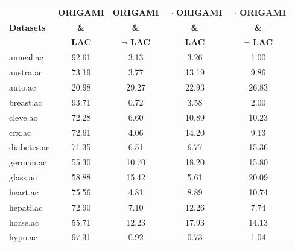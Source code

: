 \begin{table}[htbp]
	\centering
		\renewcommand{\tabcolsep}{1.8mm}
		\begin{tabular}{|l|c|c|c|c|}
		\hline
				& \textbf{ORIGAMI}	& \textbf{ORIGAMI}		& \textbf{$\neg$ ORIGAMI}	& \textbf{$\neg$ ORIGAMI}	\\
		\textbf{Datasets}	& \textbf{\&}		& \textbf{\&}			& \textbf{\&}			& \textbf{\&}			\\
				&  \textbf{LAC}		& \textbf{$\neg$ LAC}		& \textbf{LAC}			& \textbf{$\neg$ LAC}		\\
		\hline
		anneal.ac       & 92.61         & 3.13               & 3.26                     & 1.00                          \\
		\hline
		austra.ac       & 73.19         & 3.77               & 13.19                    & 9.86                          \\
		\hline
		auto.ac         & 20.98         & 29.27              & 22.93                    & 26.83                         \\
		\hline
		breast.ac       & 93.71         & 0.72               & 3.58                     & 2.00                          \\
		\hline
		cleve.ac        & 72.28         & 6.60               & 10.89                    & 10.23                         \\
		\hline
		crx.ac          & 72.61         & 4.06               & 14.20                    & 9.13                          \\
		\hline
		diabetes.ac     & 71.35         & 6.51               & 6.77                     & 15.36                         \\
		\hline
		german.ac       & 55.30         & 10.70              & 18.20                    & 15.80                         \\
		\hline
		glass.ac        & 58.88         & 15.42              & 5.61                     & 20.09                         \\
		\hline
		heart.ac        & 75.56         & 4.81               & 8.89                     & 10.74                         \\
		\hline
		hepati.ac       & 72.90         & 7.10               & 12.26                    & 7.74                          \\
		\hline
		horse.ac        & 55.71         & 12.23              & 17.93                    & 14.13                         \\
		\hline
		hypo.ac         & 97.31         & 0.92               & 0.73                     & 1.04                          \\

\end{tabular}
\end{table}
